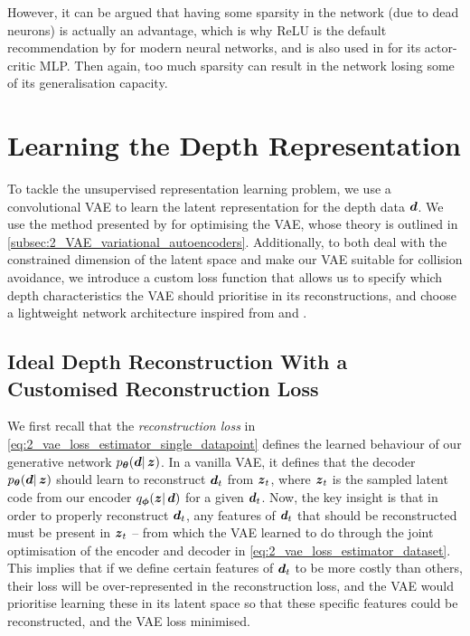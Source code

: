 However, it can be argued that having some sparsity in the network (due to dead neurons) is actually an advantage, which is why ReLU is the default recommendation by \cite{DeepLearningBook} for modern neural networks, and is also used in \cite{AMPMotionPriors} for its actor-critic MLP. Then again, too much sparsity can result in the network losing some of its generalisation capacity.

\section{Learning the Depth Representation}
\label{sec:5_learning_representation}
To tackle the unsupervised representation learning problem, we use a convolutional VAE to learn the latent representation for the depth data ${\boldsymbol{d}}$. We use the method presented by \cite{variational_bayes} for optimising the VAE, whose theory is outlined in \cref{subsec:2_VAE_variational_autoencoders}. Additionally, to both deal with the constrained dimension of the latent space and make our VAE suitable for collision avoidance, we introduce a custom loss function that allows us to specify which depth characteristics the VAE should prioritise in its reconstructions, and choose a lightweight network architecture inspired from \cite{deepCollisionPredictorOracle} and \cite{vae_decoder_architecture}.

\subsection{Ideal Depth Reconstruction With a Customised Reconstruction Loss}
We first recall that the \textit{reconstruction loss} in \eqref{eq:2_vae_loss_estimator_single_datapoint} defines the learned behaviour of our generative network $p_{\boldsymbol{\theta}}({\boldsymbol{d}} |\, \boldsymbol{z})$. In a vanilla VAE, it defines that the decoder $p_{\boldsymbol{\theta}}({\boldsymbol{d}} |\, \boldsymbol{z})$ should learn to reconstruct ${\boldsymbol{d}}_t$ from ${\boldsymbol{z}}_t$, where ${\boldsymbol{z}}_t$ is the sampled latent code from our encoder $q_{\boldsymbol{\phi}}(\boldsymbol{z} |\, {\boldsymbol{d}})$ for a given ${\boldsymbol{d}}_t$. Now, the key insight is that in order to properly reconstruct ${\boldsymbol{d}}_t$, any features of ${\boldsymbol{d}}_t$ that should be reconstructed must be present in ${\boldsymbol{z}}_t$ -- from which the VAE learned to do through the joint optimisation of the encoder and decoder in \eqref{eq:2_vae_loss_estimator_dataset}.
This implies that if we define certain features of ${\boldsymbol{d}}_t$ to be more costly than others, their loss will be over-represented in the reconstruction loss, and the VAE would prioritise learning these in its latent space so that these specific features could be reconstructed, and the VAE loss minimised. 

